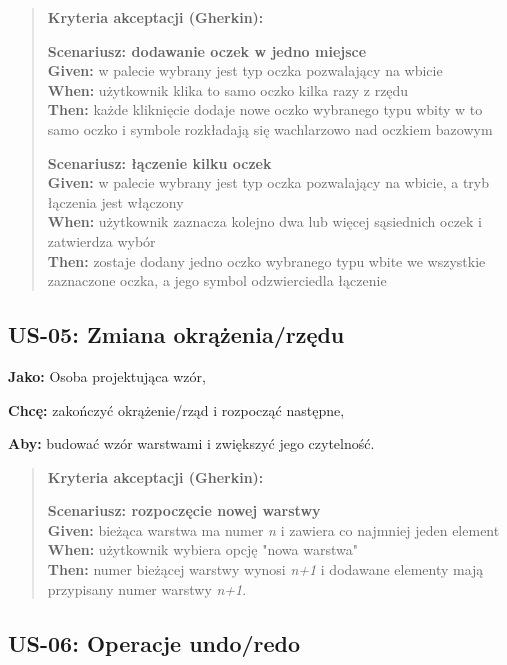 \documentclass[a4paper,11pt]{article}
\begin{document}
\begin{quote}
\textbf{Kryteria akceptacji (Gherkin):}

\textbf{Scenariusz: dodawanie oczek w jedno miejsce} \\
\textbf{Given:} w palecie wybrany jest typ oczka pozwalający na wbicie \\
\textbf{When:} użytkownik klika to samo oczko kilka razy z rzędu \\
\textbf{Then:} każde kliknięcie dodaje nowe oczko wybranego typu wbity w to samo oczko i symbole rozkładają się wachlarzowo nad oczkiem bazowym

\textbf{Scenariusz: łączenie kilku oczek} \\
\textbf{Given:} w palecie wybrany jest typ oczka pozwalający na wbicie, a tryb łączenia jest włączony \\
\textbf{When:} użytkownik zaznacza kolejno dwa lub więcej sąsiednich oczek i zatwierdza wybór \\
\textbf{Then:} zostaje dodany jedno oczko wybranego typu wbite we wszystkie zaznaczone oczka, a jego symbol odzwierciedla łączenie
\end{quote}

\subsection*{\textbf{US-05: Zmiana okrążenia/rzędu}}

\noindent\textbf{Jako:} Osoba projektująca wzór,\par
\noindent\textbf{Chcę:} zakończyć okrążenie/rząd i rozpocząć następne,\par
\noindent\textbf{Aby:} budować wzór warstwami i zwiększyć jego czytelność.\par

\begin{quote}
\textbf{Kryteria akceptacji (Gherkin):}

\textbf{Scenariusz: rozpoczęcie nowej warstwy} \\
\textbf{Given:} bieżąca warstwa ma numer \textit{n} i zawiera co najmniej jeden element \\
\textbf{When:} użytkownik wybiera opcję "nowa warstwa" \\
\textbf{Then:} numer bieżącej warstwy wynosi \textit{n+1} i dodawane elementy mają przypisany numer warstwy \textit{n+1}.
\end{quote}

\subsection*{\textbf{US-06: Operacje undo/redo}}
\end{document}
